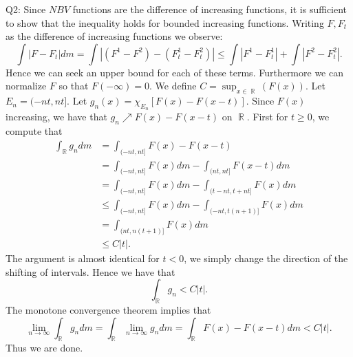\documentclass[letterpaper]{article}
\DeclareMathOperator{\R}{\mathbb{R}}
\begin{document}
\noindent Q2: Since $NBV$ functions are the difference of increasing functions, it is sufficient to show that the inequality holds for bounded increasing functions. 
Writing $F,F_t$ as the difference of increasing functions we observe: $$\int |F - F_t| dm  = \int |(F^1-F^2) -(F^1_t - F^2_t)| \leq \int |F^1-F^1_t| + \int |F^2-F^2_t|.$$ 
Hence we can seek an upper bound for each of these terms.
Furthermore we can normalize $F$ so that $F(-\infty ) = 0$. 
We define $C = \sup_{x\in \R}(F(x)).$ Let $E_n = (-nt,nt]$. Let $g_n(x) = \chi_{E_n}[F(x) - F(x-t)]$. Since $F(x)$ increasing, we have that $g_n \nearrow F(x)-F(x-t)$ on $\R$. 
First for $t \geq 0$, we compute that 
\begin{align*}
    \int_{\R} g_n dm & = \int_{(-nt, nt]} F(x) - F(x-t)
    \\ & = \int_{(-nt, nt]} F(x) dm - \int_{(nt,nt]} F(x-t)dm 
    \\ & = \int_{(-nt, nt]} F(x) dm -\int_{(t-nt, t+nt]} F(x)dm \tag{by change of variables}
    \\ & \leq \int_{(-nt, nt]} F(x) dm - \int_{(-nt, t(n+1)]}F(x) dm \tag{since $F(x)$ increasing}
    \\ & = \int_{(nt, n(t+1)]} F(x) dm 
    \\ & \leq C |t|. \tag{since $F(x)$ bounded}
\end{align*}
The argument is almost identical for $t<0$, we simply change the direction of the shifting of intervals. Hence we have that $$\int_{\R} g_n < C|t|.$$
The monotone convergence theorem implies that $$\lim_{n\to \infty} \int_{\R} g_n dm= \int_{\R} \lim_{n\to \infty} g_n dm  = \int_{\R} F(x)- F(x-t)dm < C|t|.$$
Thus we are done. 
\end{document}
